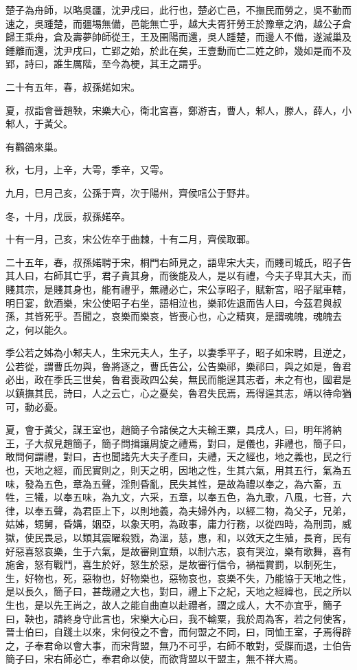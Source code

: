 \begin{pinyinscope}
楚子為舟師，以略吳疆，沈尹戌曰，此行也，楚必亡邑，不撫民而勞之，吳不動而速之，吳踵楚，而疆埸無備，邑能無亡乎，越大夫胥犴勞王於豫章之汭，越公子倉歸王乘舟，倉及壽夢帥師從王，王及圉陽而還，吳人踵楚，而邊人不備，遂滅巢及鍾離而還，沈尹戌曰，亡郢之始，於此在矣，王壹動而亡二姓之帥，幾如是而不及郢，詩曰，誰生厲階，至今為梗，其王之謂乎。

二十有五年，春，叔孫婼如宋。

夏，叔詣會晉趙鞅，宋樂大心，衛北宮喜，鄭游吉，曹人，邾人，滕人，薛人，小邾人，于黃父。

有鸜鵒來巢。

秋，七月，上辛，大雩，季辛，又雩。

九月，巳月己亥，公孫于齊，次于陽州，齊侯唁公于野井。

冬，十月，戊辰，叔孫婼卒。

十有一月，己亥，宋公佐卒于曲棘，十有二月，齊侯取鄆。

二十五年，春，叔孫婼聘于宋，桐門右師見之，語卑宋大夫，而賤司城氏，昭子告其人曰，右師其亡乎，君子貴其身，而後能及人，是以有禮，今夫子卑其大夫，而賤其宗，是賤其身也，能有禮乎，無禮必亡，宋公享昭子，賦新宮，昭子賦車轄，明日宴，飲酒樂，宋公使昭子右坐，語相泣也，樂祁佐退而告人曰，今茲君與叔孫，其皆死乎。吾聞之，哀樂而樂哀，皆喪心也，心之精爽，是謂魂魄，魂魄去之，何以能久。

季公若之姊為小邾夫人，生宋元夫人，生子，以妻季平子，昭子如宋聘，且逆之，公若從，謂曹氏勿與，魯將逐之，曹氏告公，公告樂祁，樂祁曰，與之如是，魯君必出，政在季氏三世矣，魯君喪政四公矣，無民而能逞其志者，未之有也，國君是以鎮撫其民，詩曰，人之云亡，心之憂矣，魯君失民焉，焉得逞其志，靖以待命猶可，動必憂。

夏，會于黃父，謀王室也，趙簡子令諸侯之大夫輸王粟，具戌人，曰，明年將納王，子大叔見趙簡子，簡子問揖讓周旋之禮焉，對曰，是儀也，非禮也，簡子曰，敢問何謂禮，對曰，吉也聞諸先大夫子產曰，夫禮，天之經也，地之義也，民之行也，天地之經，而民實則之，則天之明，因地之性，生其六氣，用其五行，氣為五味，發為五色，章為五聲，淫則昏亂，民失其性，是故為禮以奉之，為六畜，五牲，三犧，以奉五味，為九文，六采，五章，以奉五色，為九歌，八風，七音，六律，以奉五聲，為君臣上下，以則地義，為夫婦外內，以經二物，為父子，兄弟，姑姊，甥舅，昏媾，姻亞，以象天明，為政事，庸力行務，以從四時，為刑罰，威獄，使民畏忌，以類其震曜殺戮，為溫，慈，惠，和，以效天之生殖，長育，民有好惡喜怒哀樂，生于六氣，是故審則宜類，以制六志，哀有哭泣，樂有歌舞，喜有施舍，怒有戰鬥，喜生於好，怒生於惡，是故審行信令，禍福賞罰，以制死生，生，好物也，死，惡物也，好物樂也，惡物哀也，哀樂不失，乃能協于天地之性，是以長久，簡子曰，甚哉禮之大也，對曰，禮上下之紀，天地之經緯也，民之所以生也，是以先王尚之，故人之能自曲直以赴禮者，謂之成人，大不亦宜乎，簡子曰，鞅也，請終身守此言也，宋樂大心曰，我不輸粟，我於周為客，若之何使客，晉士伯曰，自踐土以來，宋何役之不會，而何盟之不同，曰，同恤王室，子焉得辟之，子奉君命以會大事，而宋背盟，無乃不可乎，右師不敢對，受牒而退，士伯告簡子曰，宋右師必亡，奉君命以使，而欲背盟以干盟主，無不祥大焉。


\end{pinyinscope}
